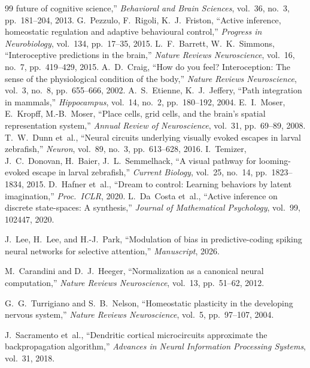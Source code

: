 \documentclass[11pt,a4paper]{article}
\begin{document}
\begin{thebibliography}{99}
  future of cognitive science,''
  \textit{Behavioral and Brain Sciences}, vol.~36, no.~3, pp.~181--204, 2013.
  G.~Pezzulo, F.~Rigoli, K.~J.~Friston,
  ``Active inference, homeostatic regulation and adaptive behavioural control,''
  \textit{Progress in Neurobiology}, vol.~134, pp.~17--35, 2015.
  L.~F.~Barrett, W.~K.~Simmons,
  ``Interoceptive predictions in the brain,''
  \textit{Nature Reviews Neuroscience}, vol.~16, no.~7, pp.~419--429, 2015.
  A.~D.~Craig,
  ``How do you feel? Interoception: The sense of the physiological
  condition of the body,''
  \textit{Nature Reviews Neuroscience}, vol.~3, no.~8, pp.~655--666, 2002.
  A.~S.~Etienne, K.~J.~Jeffery,
  ``Path integration in mammals,''
  \textit{Hippocampus}, vol.~14, no.~2, pp.~180--192, 2004.
  E.~I.~Moser, E.~Kropff, M.-B.~Moser,
  ``Place cells, grid cells, and the brain's spatial representation system,''
  \textit{Annual Review of Neuroscience}, vol.~31, pp.~69--89, 2008.
  T.~W.~Dunn et~al.,
  ``Neural circuits underlying visually evoked escapes in larval zebrafish,''
  \textit{Neuron}, vol.~89, no.~3, pp.~613--628, 2016.
  I.~Temizer, J.~C.~Donovan, H.~Baier, J.~L.~Semmelhack,
  ``A visual pathway for looming-evoked escape in larval zebrafish,''
  \textit{Current Biology}, vol.~25, no.~14, pp.~1823--1834, 2015.
  D.~Hafner et~al.,
  ``Dream to control: Learning behaviors by latent imagination,''
  \textit{Proc.\ ICLR}, 2020.
  L.~Da~Costa et~al.,
  ``Active inference on discrete state-spaces: A synthesis,''
  \textit{Journal of Mathematical Psychology}, vol.~99, 102447, 2020.

  J.~Lee, H.~Lee, and H.-J.~Park,
  ``Modulation of bias in predictive-coding spiking neural networks for
  selective attention,''
  \textit{Manuscript}, 2026.

  M.~Carandini and D.~J.~Heeger,
  ``Normalization as a canonical neural computation,''
  \textit{Nature Reviews Neuroscience}, vol.~13, pp.~51--62, 2012.

  G.~G.~Turrigiano and S.~B.~Nelson,
  ``Homeostatic plasticity in the developing nervous system,''
  \textit{Nature Reviews Neuroscience}, vol.~5, pp.~97--107, 2004.

  J.~Sacramento et~al.,
  ``Dendritic cortical microcircuits approximate the backpropagation
  algorithm,''
  \textit{Advances in Neural Information Processing Systems}, vol.~31, 2018.


\end{thebibliography}
\end{document}
